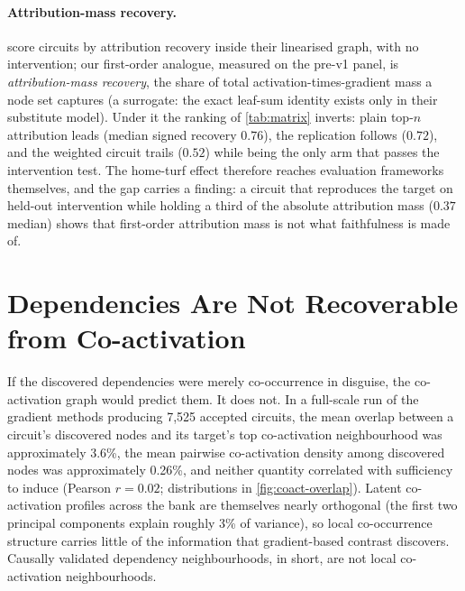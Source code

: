 \documentclass[10pt]{article}
\begin{document}
\paragraph{Attribution-mass recovery.}
\citet{ge2024automatically} score circuits by attribution recovery inside their linearised graph, with no intervention; our first-order analogue, measured on the pre-v1 panel, is \emph{attribution-mass recovery}, the share of total activation-times-gradient mass a node set captures (a surrogate: the exact leaf-sum identity exists only in their substitute model).
Under it the ranking of \cref{tab:matrix} inverts: plain top-$n$ attribution leads (median signed recovery $0.76$), the replication follows ($0.72$), and the weighted circuit trails ($0.52$) while being the only arm that passes the intervention test.
The home-turf effect therefore reaches evaluation frameworks themselves, and the gap carries a finding: a circuit that reproduces the target on held-out intervention while holding a third of the absolute attribution mass ($0.37$ median) shows that first-order attribution mass is not what faithfulness is made of.

\section{Dependencies Are Not Recoverable from Co-activation}
\label{app:coact}
\label{sec:coact-results}

If the discovered dependencies were merely co-occurrence in disguise, the co-activation graph would predict them.
It does not.
In a full-scale run of the gradient methods producing 7{,}525 accepted circuits, the mean overlap between a circuit's discovered nodes and its target's top co-activation neighbourhood was approximately 3.6\%, the mean pairwise co-activation density among discovered nodes was approximately 0.26\%, and neither quantity correlated with sufficiency to induce (Pearson $r = 0.02$; distributions in \cref{fig:coact-overlap}).
Latent co-activation profiles across the bank are themselves nearly orthogonal (the first two principal components explain roughly 3\% of variance), so local co-occurrence structure carries little of the information that gradient-based contrast discovers.
Causally validated dependency neighbourhoods, in short, are not local co-activation neighbourhoods.
\end{document}
